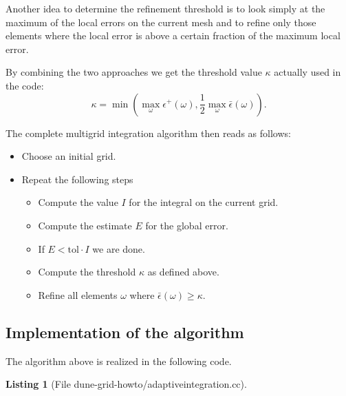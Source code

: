 \documentclass[11pt,a4paper,headinclude,footinclude,DIV16,normalheadings]{scrreprt}
\newtheorem{lst}{Listing}
\begin{document}
Another idea to determine the refinement threshold is to look simply 
at the maximum of the local errors on the current mesh and
to refine only those elements where the local error is above a certain
fraction of the maximum local error.

By combining the two approaches we get the threshold value $\kappa$
actually used in the code:
\begin{equation}
\kappa = \min\left(\max\limits_{\omega} \epsilon^+(\omega), \frac12
  \max\limits_{\omega} \bar{\epsilon}(\omega) \right).
\end{equation}


The complete multigrid integration algorithm then reads as follows:
\begin{itemize}
\item Choose an initial grid.
\item Repeat the following steps
\begin{itemize}
\item Compute the value $I$ for the integral on the current grid.
\item Compute the estimate $E$ for the global error.
\item If $E<\text{tol}\cdot I$ we are done.
\item Compute the threshold $\kappa$ as defined above.
\item Refine all elements $\omega$ where $\bar{\epsilon}(\omega)\geq\kappa$.
\end{itemize}
\end{itemize}

\subsection{Implementation of the algorithm}

The algorithm above is realized in the following code.

\begin{lst}[File dune-grid-howto/adaptiveintegration.cc] \mbox{}
\nopagebreak

\end{lst}
\end{document}
